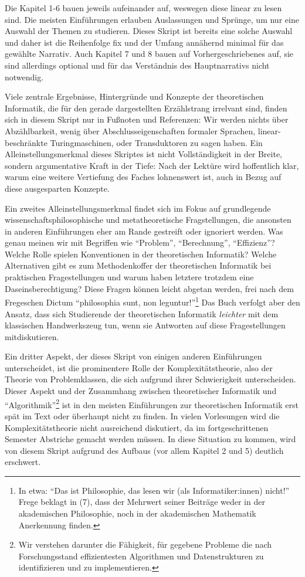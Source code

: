 Die Kapitel 1-6 bauen jeweils aufeinander auf,
weswegen diese linear zu lesen sind.
Die meisten Einführungen erlauben Auslassungen und Sprünge,
um nur eine Auswahl der Themen zu studieren.
Dieses Skript ist bereits eine solche Auswahl
und daher ist die Reihenfolge fix
und der Umfang annähernd minimal für das gewählte Narrativ.
Auch Kapitel 7 und 8 bauen auf Vorhergeschriebenes auf,
sie sind allerdings optional
und für das Verständnis des Hauptnarrativs nicht notwendig.

Viele zentrale Ergebnisse, Hintergründe und Konzepte
der theoretischen Informatik,
die für den gerade dargestellten Erzählstrang irrelvant sind,
finden sich in diesem Skript nur in Fußnoten und Referenzen:
Wir werden nichts über Abzählbarkeit,
wenig über Abschlusseigenschaften formaler Sprachen,
linear-beschränkte Turingmaschinen,
oder Transduktoren zu sagen haben.
Ein Alleinstellungsmerkmal dieses Skriptes ist nicht Vollständigkeit in der Breite,
sondern argumentative Kraft in der Tiefe:
Nach der Lektüre wird hoffentlich klar,
warum eine weitere Vertiefung des Faches lohnenswert ist,
auch in Bezug auf diese ausgesparten Konzepte.

Ein zweites Alleinstellungsmerkmal findet sich im Fokus auf grundlegende
wissenschaftsphilosophische und metatheoretische Fragstellungen,
die ansonsten in anderen Einführungen eher am Rande gestreift
oder ignoriert werden.
Was genau meinen wir mit Begriffen wie ``Problem'', ``Berechnung'', ``Effizienz''?
Welche Rolle spielen Konventionen in der theoretischen Informatik?
Welche Alternativen gibt es zum Methodenkoffer der theoretischen Informatik
bei praktischen Fragestellungen
und warum haben letztere trotzdem eine Daseinsberechtigung?
Diese Fragen können leicht abgetan werden, frei nach dem Fregeschen Dictum
``philosophia sunt, non leguntur!''\footnote{
    In etwa: ``Das ist Philosophie,
    das lesen wir (als Informatiker:innen) nicht!''
    Frege beklagt in \cite{frege_grundgesetze} (7),
    dass der Mehrwert seiner Beiträge weder in der akademischen Philosophie,
    noch in der akademischen Mathematik Anerkennung finden.
}
Das Buch verfolgt aber den Ansatz,
dass sich Studierende der theoretischen Informatik
\emph {leichter} mit dem klassischen Handwerkszeug tun,
wenn sie Antworten auf diese Fragestellungen mitdiskutieren.

Ein dritter Aspekt, der dieses Skript von einigen anderen Einführungen unterscheidet,
ist die prominentere Rolle der Komplexitätstheorie,
also der Theorie von Problemklassen,
die sich aufgrund ihrer Schwierigkeit unterscheiden.
Dieser Aspekt und der Zusammhang zwischen theoretischer Informatik und ``Algorithmik''\footnote{
    Wir verstehen darunter die Fähigkeit,
    für gegebene Probleme die nach Forschungsstand
    effizientesten Algorithmen und Datenstrukturen zu identifizieren
    und zu implementieren.}
ist in den meisten Einführungen zur theoretischen Informatik
erst spät im Text oder überhaupt nicht zu finden.
In vielen Vorlesungen wird die Komplexitätstheorie nicht ausreichend diskutiert,
da im fortgeschrittenen Semester Abstriche gemacht werden müssen.
In diese Situation zu kommen, wird von diesem Skript aufgrund des Aufbaus
(vor allem Kapitel 2 und 5) deutlich erschwert.


